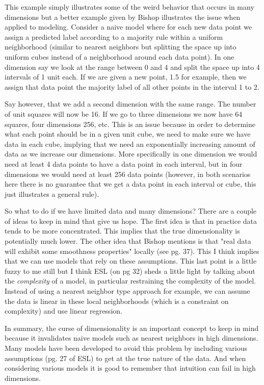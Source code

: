 This example simply illustrates some of the weird behavior that occurs in many dimensions but a better example given by Bishop illustrates the issue when applied to modeling. Consider a naive model where for each new data point we assign a predicted label according to a majority rule within a uniform neighborhood (similar to nearest neighbors but splitting the space up into uniform cubes instead of a neighborhood around each data point). In one dimension say we look at the range between 0 and 4 and split the space up into 4 intervals of 1 unit each. If we are given a new point, 1.5 for example, then we assign that data point the majority label of all other points in the interval 1 to 2. 

Say however, that we add a second dimension with the same range. The number of unit squares will now be 16. If we go to three dimensions we now have 64 squares, four dimensions 256, etc. This is an issue because in order to determine what each point should be in a given unit cube, we need to make sure we have data in each cube, implying that we need an exponentially increasing amount of data as we increase our dimensions. More specifically in one dimension we would need at least 4 data points to have a data point in each interval, but in four dimensions we would need at least 256 data points (however, in both scenarios here there is no guarantee that we get a data point in each interval or cube, this just illustrates a general rule).

So what to do if we have limited data and many dimensions? There are a couple of ideas to keep in mind that give us hope. The first idea is that in practice data tends to be more concentrated. This implies that the true dimensionality is potentially much lower. The other idea that Bishop mentions is that "real data will exhibit some smoothness properties" locally (see pg. 37). This I think implies that we can use models that rely on these assumptions. This last point is a little fuzzy to me still but I think ESL (on pg 32) sheds a little light by talking about the \emph{complexity} of a model, in particular restraining the complexity of the model. Instead of using a nearest neighbor type approach for example, we can assume the data is linear in these local neighborhoods (which is a constraint on complexity) and use linear regression.

In summary, the curse of dimensionality is an important concept to keep in mind because it invalidates naive models such as nearest neighbors in high dimensions. Many models have been developed to avoid this problem by including various assumptions (pg. 27 of ESL) to get at the true nature of the data. And when considering various models it is good to remember that intuition can fail in high dimensions.


